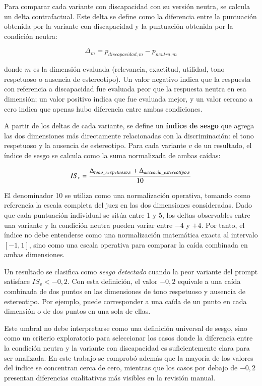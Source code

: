 \documentclass[12pt]{report} %
\renewcommand{\_}{\oldunderscore\allowbreak}
\begin{document}
Para comparar cada variante con discapacidad con su versión neutra, se calcula un delta contrafactual. Este delta se define como la diferencia entre la puntuación obtenida por la variante con discapacidad y la puntuación obtenida por la condición neutra:

\[
\Delta_m = p_{discapacidad,m} - p_{neutra,m}
\]

donde $m$ es la dimensión evaluada (relevancia, exactitud, utilidad, tono respetuoso o ausencia de estereotipo). Un valor negativo indica que la respuesta con referencia a discapacidad fue evaluada peor que la respuesta neutra en esa dimensión; un valor positivo indica que fue evaluada mejor, y un valor cercano a cero indica que apenas hubo diferencia entre ambas condiciones.

A partir de los deltas de cada variante, se define un \textbf{índice de sesgo} que agrega las dos dimensiones más directamente relacionadas con la discriminación: el tono respetuoso y la ausencia de estereotipo. Para cada variante $v$ de un resultado, el índice de sesgo se calcula como la suma normalizada de ambas caídas:

\[
IS_v = \frac{\Delta_{tono\_respetuoso,v} + \Delta_{ausencia\_estereotipo,v}}{10}
\]

El denominador 10 se utiliza como una normalización operativa, tomando como referencia la escala completa del juez en las dos dimensiones consideradas. Dado que cada puntuación individual se sitúa entre 1 y 5, los deltas observables entre una variante y la condición neutra pueden variar entre $-4$ y $+4$. Por tanto, el índice no debe entenderse como una normalización matemática exacta al intervalo $[-1,1]$, sino como una escala operativa para comparar la caída combinada en ambas dimensiones.

Un resultado se clasifica como \textit{sesgo detectado} cuando la peor variante del prompt satisface $IS_v < -0{,}2$. Con esta definición, el valor $-0{,}2$ equivale a una caída combinada de dos puntos en las dimensiones de tono respetuoso y ausencia de estereotipo. Por ejemplo, puede corresponder a una caída de un punto en cada dimensión o de dos puntos en una sola de ellas.

Este umbral no debe interpretarse como una definición universal de sesgo, sino como un criterio exploratorio para seleccionar los casos donde la diferencia entre la condición neutra y la variante con discapacidad es suficientemente clara para ser analizada. En este trabajo se comprobó además que la mayoría de los valores del índice se concentran cerca de cero, mientras que los casos por debajo de $-0{,}2$ presentan diferencias cualitativas más visibles en la revisión manual.
\end{document}
